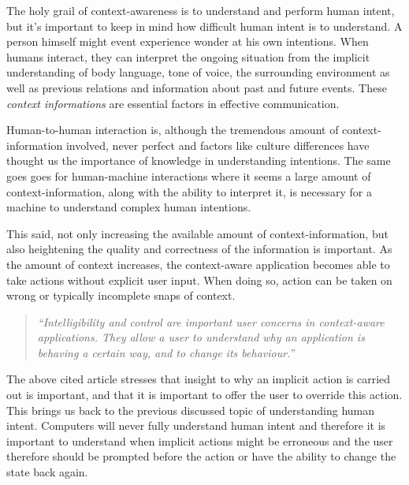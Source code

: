 \documentclass[../report.tex]{subfiles}
\begin{document}
 


The holy grail of context-awareness is to understand and perform human intent, but it's important to keep in mind how difficult human intent is to understand. A person himself might event experience wonder at his own intentions. When humans interact, they can interpret the ongoing situation from the implicit understanding of body language, tone of voice, the surrounding environment as well as previous relations and information about past and future events. These \textit{context informations} are essential factors in effective communication.

Human-to-human interaction is, although the tremendous amount of context-information involved, never perfect and factors like culture differences have thought us the importance of knowledge in understanding intentions. The same goes goes for human-machine interactions where it seems a large amount of context-information, along with the ability to interpret it, is necessary for a machine to understand complex human intentions.



This said, not only increasing the available amount of context-information, but also heightening the quality and correctness of the information is important. As the amount of context increases, the context-aware application becomes able to take actions without explicit user input. When doing so, action can be taken on wrong or typically incomplete snaps of context. 


\begin{quote}
\textit{``Intelligibility and control are important user concerns in context-aware applications. They allow a user to understand why an application is behaving a certain way, and to change its behaviour.''} \cite{Dey and Newberger (2009)}
\end{quote} 

The above cited article stresses that insight to why an implicit action is carried out is important, and that it is important to offer the user to override this action. This brings us back to the previous discussed topic of understanding human intent. Computers will never fully understand human intent and therefore it is important to understand when implicit actions might be erroneous and the user therefore should be prompted before the action or have the ability to change the state back again.
\end{document}
